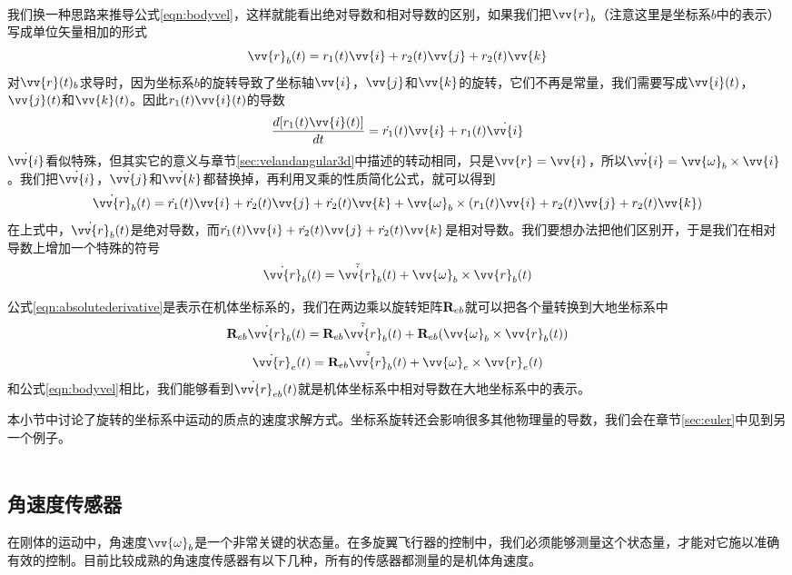 \documentclass[11pt]{article}
\begin{document}

\ \\

我们换一种思路来推导公式\ref{eqn:bodyvel}，这样就能看出绝对导数和相对导数的区别，如果我们把$\vv{r}_b$（注意这里是坐标系$b$中的表示）写成单位矢量相加的形式
$$
\vv{r}_b(t) = r_1(t)\vv{i}+r_2(t)\vv{j}+r_2(t)\vv{k}
$$
对$\vv{r}(t)_b$求导时，因为坐标系$b$的旋转导致了坐标轴$\vv{i}$，$\vv{j}$和$\vv{k}$的旋转，它们不再是常量，我们需要写成$\vv{i}(t)$，$\vv{j}(t)$和$\vv{k}(t)$。因此$r_1(t)\vv{i}(t)$的导数
$$
\frac{d[r_1(t)\vv{i}(t)]}{dt} = \dot{r_1}(t)\vv{i} + r_1(t)\dot{\vv{i}}
$$
$\dot{\vv{i}}$看似特殊，但其实它的意义与章节\ref{sec:velandangular3d}中描述的转动相同，只是$\vv{r} = \vv{i}$，所以$\dot{\vv{i}} = \vv{\omega}_b \times \vv{i}$。我们把$\dot{\vv{i}}$，$\dot{\vv{j}}$和$\dot{\vv{k}}$都替换掉，再利用叉乘的性质简化公式，就可以得到
$$
\dot{\vv{r}}_b(t) = \dot{r_1}(t)\vv{i}+\dot{r_2}(t)\vv{j}+\dot{r_2}(t)\vv{k} + \vv{\omega}_b \times (r_1(t)\vv{i}+r_2(t)\vv{j}+r_2(t)\vv{k}) 
$$
在上式中，$\dot{\vv{r}}_b(t)$是绝对导数，而$\dot{r_1}(t)\vv{i}+\dot{r_2}(t)\vv{j}+\dot{r_2}(t)\vv{k}$是相对导数。我们要想办法把他们区别开，于是我们在相对导数上增加一个特殊的符号
\begin{equation}\label{eqn:absolutederivative}
\dot{\vv{r}}_b(t) = \tilde{\dot{\vv{r}}}_b(t) + \vv{\omega}_b \times  \vv{r}_b(t)
\end{equation}

公式\ref{eqn:absolutederivative}是表示在机体坐标系的，我们在两边乘以旋转矩阵${\bf R}_{eb}$就可以把各个量转换到大地坐标系中
$$
{\bf R}_{eb}\dot{\vv{r}}_b(t) = {\bf R}_{eb}\tilde{\dot{\vv{r}}}_b(t) + {\bf R}_{eb}(\vv{\omega}_b \times  \vv{r}_b(t))
$$
$$
\dot{\vv{r}}_e(t) = {\bf R}_{eb}\tilde{\dot{\vv{r}}}_b(t) + \vv{\omega}_e \times  \vv{r}_e(t)
$$
和公式\ref{eqn:bodyvel}相比，我们能够看到$\dot{\vv{r}}_{eb}(t)$就是机体坐标系中相对导数在大地坐标系中的表示。

本小节中讨论了旋转的坐标系中运动的质点的速度求解方式。坐标系旋转还会影响很多其他物理量的导数，我们会在章节\ref{sec:euler}中见到另一个例子。
\ \\
\ \\

\subsection{角速度传感器}\label{sec:angularsensor}
在刚体的运动中，角速度$\vv{\omega}_b$是一个非常关键的状态量。在多旋翼飞行器的控制中，我们必须能够测量这个状态量，才能对它施以准确有效的控制。目前比较成熟的角速度传感器有以下几种，所有的传感器都测量的是机体角速度。
\end{document}
